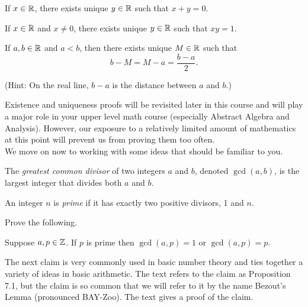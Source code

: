 \newpage
\begin{claim}  If $x \in \mathbb{R}$, there exists unique $y \in \mathbb{R}$ such that $x+y=0$.
\end{claim}

\vspace{4in}

\begin{claim}  If $x \in \mathbb{R}$ and $x \neq 0$, there exists unique $y \in \mathbb{R}$ such that $xy=1$.
\end{claim}

\newpage

\begin{claim}  If $a,b \in \mathbb{R}$ and $a<b$, then there exists unique $M \in \mathbb{R}$ such that
\[b-M=M-a = \frac{b-a}{2}.\]
\end{claim}
\noindent (Hint: On the real line, $b-a$ is the distance between $a$ and $b$.)

\vspace{5in}

\noindent  Existence and uniqueness proofs will be revisited later in this course and will play a major role in your upper level math course (especially Abstract Algebra and Analysis).  However, our exposure to a relatively limited amount of mathematics at this point will prevent us from proving them too often.\\

\noindent We move on now to working with some ideas that should be familiar to you.  

\begin{definition}  The \textit{greatest common divisor} of two integers $a$ and $b$, denoted $\gcd(a,b)$, is the largest integer that divides both $a$ and $b$.
\end{definition}

\begin{definition}[Prime]  An integer $n$ is \textit{prime} if it has exactly two positive divisors, 1 and $n$.
\end{definition}
\newpage
\begin{question}[resume]
\item Prove the following.
\end{question}
\begin{claim} Suppose $a,p \in \mathbb{Z}$.  If $p$ is prime then $\gcd(a,p)=1$ or $\gcd(a,p)=p$.
\end{claim}


\vspace{4in}

\noindent The next claim is very commonly used in basic number theory and ties together a variety of ideas in basic arithmetic.  The text refers to the claim as Proposition 7.1, but the claim is so common that we will refer to it by the name Bezout's Lemma (pronounced BAY-Zoo).  The text gives a proof of the claim.

